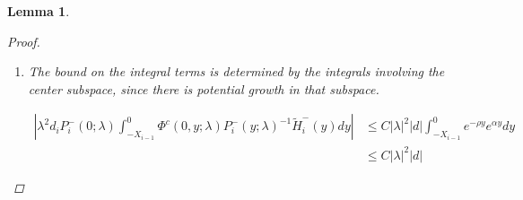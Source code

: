 \documentclass[12pt]{article}
\newtheorem{lemma}{Lemma}
\begin{document}
\begin{lemma}
\begin{proof}
\begin{enumerate}
To put this in terms of $c_i^-$, we use the expression

\[
c_i^+ = c_i^- + P_0^c(\lambda) D_i d + A_2(\lambda)_i^c(b, c^-, d) )
\]

from Lemma \ref{inv1}, together with the bound for $A_2$.

\begin{align*}
e^{-\nu(\lambda)X_i} c_i^+ &= e^{-\nu(\lambda)X_i} c_i^- 
+ e^{-\nu(\lambda)X_i} P_0^c(\lambda) D_i d + e^{-\nu(\lambda)X_i} A_2(\lambda)_i^c(b, d)\\
&= e^{-\nu(\lambda)X_i} c_i^- + \mathcal{O}\Big( e^{-(\alpha - \rho) X_i} ( |\lambda| + e^{-\alpha X_i} ) |d|) + e^{-(\alpha - \rho) X_i} (|b_i^+| + |b_{i+1}^-| + |c_i^-|)\\
&+ e^{-(\alpha - 2 \rho) X_i} |\lambda|^2|d| + e^{-(\alpha - \rho) X_i} |D_i||d| )
\end{align*}

Thus we have the expression for $e^{-\nu(\lambda)X_i} c_i^+$

\begin{align}\label{tildecminus2}
e^{-\nu(\lambda)X_i} c_i^+
&= e^{-\nu(\lambda)X_i} c_i^- + \mathcal{O}\Big( e^{-(\alpha - \rho) X_i} ( |b_i^+| + |b_{i+1}^-| + |c_i^-| + |\lambda||d| + |D_i||d|) \Big)
\end{align}

which gives us the overall estimate

\begin{align*}
&|(P_i^+(0; \lambda) - P^+(0))P_0^c(0) e^{-\nu(\lambda)X_i} c_i^+ + P_i^+(0; \lambda) (P_0^c(\lambda) - P_0^c(0)) e^{-\nu(\lambda)X_i} c_i^+| \\
&\leq C \Big( (e^{-\alpha X_m} + |\lambda|)( e^{-\nu(\lambda)X_i} c_i^- + e^{-(\alpha - \rho) X_i} ( |b_i^+| + |b_{i+1}^-| + |c_i^-| + |\lambda||d| + |D_i||d|) \Big) \\
&\leq C \Big( (e^{-\alpha X_m} + |\lambda|)( |\tilde{c}_i^-| + e^{-(\alpha - \rho) X_i} ( |b_i^+| + |b_{i+1}^-| + |c_i^-| + |\lambda||d| + |D_i||d|) \Big)
\end{align*}

\item The bound on the integral terms is determined by the integrals involving the center subspace, since there is potential growth in that subspace.

\begin{align*}
\left| \lambda^2 d_i P_i^-(0; \lambda) \int_{-X_{i-1}}^0 \Phi^c(0, y; \lambda) P_i^-(y; \lambda)^{-1} \tilde{H}_i^-(y) dy \right| &\leq C |\lambda|^2 |d| \int_{-X_{i-1}}^0 e^{-\rho y} e^{\alpha y} dy \\
&\leq C |\lambda|^2 |d|
\end{align*}


\end{enumerate}
\end{proof}
\end{lemma}
\end{document}
